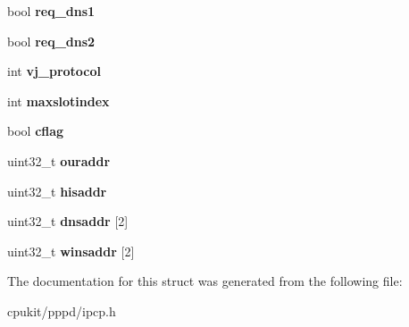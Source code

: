 \begin{DoxyCompactItemize}
bool {\bfseries req\+\_\+dns1}
\item 
\mbox{\label{structipcp__options_aa45bec4a1d4c5c5816b7236c22615b5d}} 
bool {\bfseries req\+\_\+dns2}
\item 
\mbox{\label{structipcp__options_aa3a88fe6d4df5ac7b2f315b4d632931e}} 
int {\bfseries vj\+\_\+protocol}
\item 
\mbox{\label{structipcp__options_a9c35a0bc10d9e63ea066ef9d29752a53}} 
int {\bfseries maxslotindex}
\item 
\mbox{\label{structipcp__options_a854f17d24fad4655030d42693a9f2c48}} 
bool {\bfseries cflag}
\item 
\mbox{\label{structipcp__options_ad484428f7b6ee672c188bf5fa4806955}} 
uint32\+\_\+t {\bfseries ouraddr}
\item 
\mbox{\label{structipcp__options_a5e71eb229a26915333d042b6c052364c}} 
uint32\+\_\+t {\bfseries hisaddr}
\item 
\mbox{\label{structipcp__options_ada5496aa4366d1f1a769c8045003bfc6}} 
uint32\+\_\+t {\bfseries dnsaddr} \mbox{[}2\mbox{]}
\item 
\mbox{\label{structipcp__options_a9e5e1231bf0e610df5a27402760a043e}} 
uint32\+\_\+t {\bfseries winsaddr} \mbox{[}2\mbox{]}
\end{DoxyCompactItemize}


The documentation for this struct was generated from the following file\+:\begin{DoxyCompactItemize}
\item 
cpukit/pppd/ipcp.\+h\end{DoxyCompactItemize}
